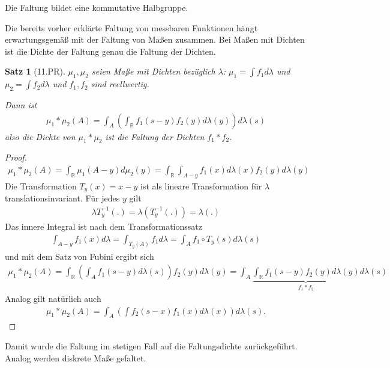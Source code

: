\documentclass[]{article}
\newtheorem{theorem}{Satz}
\begin{document}
Die Faltung bildet eine kommutative Halbgruppe.

Die bereits vorher erklärte Faltung von messbaren Funktionen hängt erwartungsgemäß mit der Faltung von Maßen zusammen. Bei Maßen mit Dichten ist die Dichte der Faltung genau die Faltung der Dichten.

\begin{theorem}[11.PR]
	$\mu_1,\mu_2$ seien Maße mit Dichten bezüglich $\lambda$: $\mu_1 = \int f_1 d\lambda$ und $\mu_2 = \int f_2d\lambda$ und $f_1,f_2$ sind reellwertig.
	
	Dann ist
	\begin{align*}
		\mu_1 * \mu_2(A) = \int_A\left(\int_\mathbb{R} f_1(s-y) f_2(y) d\lambda(y) \right) d\lambda(s)
	\end{align*}
	 also die Dichte von $\mu_1 * \mu_2$ ist die Faltung der Dichten $f_1 * f_2$.
\end{theorem}
\begin{proof}
	\begin{align*}
		\mu_1 * \mu_2 (A) = \int_{\mathbb{R}} \mu_1(A-y) d\mu_2(y) = \int_{\mathbb{R}} \int_{A-y} f_1(x) d\lambda(x) f_2(y) d\lambda(y)
	\end{align*}
	Die Transformation $T_y(x) = x-y$ ist als lineare Transformation für $\lambda$ translationsinvariant. Für jedes $y$ gilt
	\begin{align*}
		\lambda T_y^{-1}(.) = \lambda(T_y^{-1}(.)) = \lambda(.)
	\end{align*}
	Das innere Integral ist nach dem Transformationssatz
	\begin{align*}
		\int_{A-y} f_1(x) d\lambda = \int_{T_y(A)} f_1 d\lambda = \int_A f_1\circ T_y(s) d\lambda(s)
	\end{align*}
	und mit dem Satz von Fubini ergibt sich
	\begin{align*}
		\mu_1 * \mu_2 (A) = \int_{\mathbb{R}} \left(\int_A f_1(s-y) d\lambda(s) \right) f_2(y) d\lambda(y) = \int_A \underbrace{\int_{\mathbb{R}} f_1(s-y) f_2(y) d\lambda(y)}_{f_1 * f_2} d\lambda(s)
	\end{align*}
	Analog gilt natürlich auch
	\begin{align*}
		\mu_1 * \mu_2 (A) = \int_A \left(\int f_2(s-x) f_1(x) d\lambda(x) \right) d\lambda(s).
	\end{align*}
\end{proof}

Damit wurde die Faltung im stetigen Fall auf die Faltungsdichte zurückgeführt. Analog werden diskrete Maße gefaltet.
\end{document}
